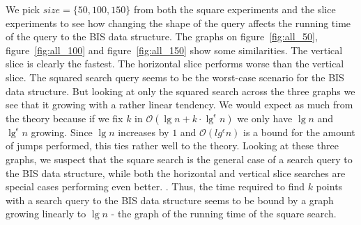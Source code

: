 We pick $size=\{50,100,150\}$ from both the square experiments and the slice experiments to see how changing the shape of the query affects the running time of the query to the BIS data structure. The graphs on figure~\ref{fig:all_50}, figure~\ref{fig:all_100} and figure~\ref{fig:all_150} show some similarities. The vertical slice is clearly the fastest. The horizontal slice performs worse than the vertical slice. The squared search query seems to be the worst-case scenario for the BIS data structure. But looking at only the squared search across the three graphs we see that it growing with a rather linear tendency. We would expect as much from the theory because if we fix $k$ in $\mathcal{O}(\lg n + k\cdot \lg^\epsilon n)$ we only have $\lg n$ and $\lg^\epsilon n$ growing. Since $\lg n$ increases by $1$ and $\mathcal{O}(lg^\epsilon n)$ is a bound for the amount of jumps performed, this ties rather well to the theory. Looking at these three graphs, we suspect that the square search is the general case of a search query to the BIS data structure, while both the horizontal and vertical slice searches are special cases performing even better. . Thus, the time required to find $k$ points with a search query to the BIS data structure seems to be bound by a graph growing linearly to $\lg n$ - the graph of the running time of the square search.


